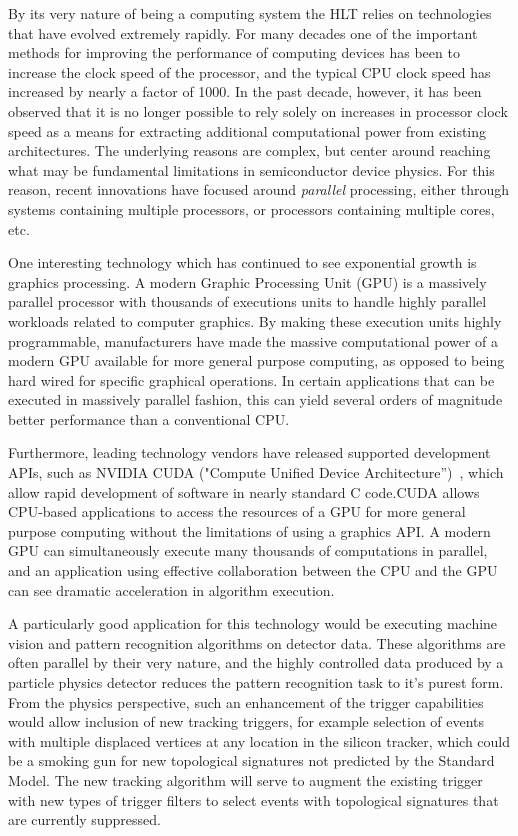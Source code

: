 \documentclass{JINST}
\begin{document}
By its very nature of being a computing system the HLT relies on technologies that have evolved
extremely rapidly.  For many decades one of the important methods for improving the performance of computing devices
has been to increase the clock speed of the processor, and the typical CPU clock speed has increased by nearly a factor of 1000.
In the past decade, however, it has been observed that it is no longer possible to rely solely on increases
in processor clock speed as a means for extracting additional computational power from existing architectures.
The underlying reasons are complex, but center around reaching what may be fundamental limitations in
semiconductor device physics.  For this reason, recent innovations have focused around {\em parallel}
processing, either through systems containing multiple processors, or processors containing multiple cores, etc.

One interesting technology which has continued to see exponential growth is graphics processing.  
A modern Graphic Processing Unit (GPU) is a massively parallel processor with thousands of executions units to handle highly parallel workloads
related to computer graphics.  By making these execution units highly programmable, manufacturers have made
the massive computational power of a modern GPU available for more general purpose computing,
as opposed to being hard wired for specific graphical operations.  In certain applications that can be executed in massively parallel
 fashion, this can yield several orders of magnitude better performance than a conventional CPU.


Furthermore, leading technology vendors have released supported development APIs, such as NVIDIA
CUDA ("Compute Unified Device Architecture'')~\cite{bib:CUDA}, which allow rapid development of
software in nearly standard C code.CUDA allows CPU-based applications to access the resources of a GPU 
for more general purpose computing without the limitations of using a graphics API.
 A modern GPU can simultaneously execute many thousands of computations in parallel, and an application using 
effective collaboration between the CPU and the GPU can see dramatic acceleration in algorithm execution.

A particularly good application for this technology would be executing machine vision
and pattern recognition algorithms on detector data.  These algorithms are often parallel
by their very nature, and the highly controlled data produced by a particle physics detector
reduces the pattern recognition task to it's purest form.  From the physics perspective,
such an enhancement of the trigger capabilities would allow inclusion of new tracking triggers, 
for example selection of events with multiple displaced
vertices at any location in the silicon tracker, which could be a smoking gun for new topological
signatures not predicted by the Standard Model.  The new tracking algorithm  will serve to
augment the existing trigger with new types of trigger filters to select events with topological signatures
that are currently suppressed. 
\end{document}
